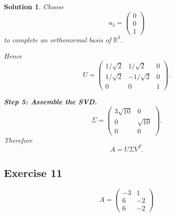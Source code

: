 \documentclass[11pt,a4paper]{article}
\theoremstyle{sol}
\newtheorem*{solution}{Solution}
\newcommand{\R}{\mathbb{R}}
\begin{document}
\begin{solution}
Choose
\[
u_3=\begin{pmatrix}0\\0\\1\end{pmatrix}
\]
to complete an orthonormal basis of $\R^3$.

Hence
\[
U=
\begin{pmatrix}
1/\sqrt2&1/\sqrt2&0\\
1/\sqrt2&-1/\sqrt2&0\\
0&0&1
\end{pmatrix}.
\]

\textbf{Step 5: Assemble the SVD.}
\[
\Sigma=
\begin{pmatrix}
3\sqrt{10}&0\\
0&\sqrt{10}\\
0&0
\end{pmatrix}.
\]
Therefore
\[
\boxed{
A=U\Sigma V^T.
}
\]
\end{solution}

\clearpage
\subsection*{Exercise 11}
\[
A=\begin{pmatrix}-3&1\\6&-2\\6&-2\end{pmatrix}
\]
\end{document}
